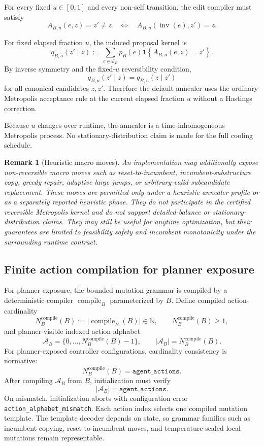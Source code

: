 \documentclass[11pt]{article}
\newtheorem{remark}{Remark}
\begin{document}
For every fixed $u\in[0,1]$ and every non-self transition, the edit compiler
must satisfy
\[
A_{B,u}(e,z)=z'\ne z
\quad\Longleftrightarrow\quad
A_{B,u}(\operatorname{inv}(e),z')=z.
\]

For fixed elapsed fraction $u$, the induced proposal kernel is
\[
q_{B,u}(z'\mid z)
:=
\sum_{e\in\mathcal{E}_B}
p_B(e)\mathbf{1}\!\left\{A_{B,u}(e,z)=z'\right\}.
\]
By inverse symmetry and the fixed-$u$ reversibility condition,
\[
q_{B,u}(z'\mid z)=q_{B,u}(z\mid z')
\]
for all canonical candidates $z,z'$. Therefore the default annealer uses the
ordinary Metropolis acceptance rule at the current elapsed fraction $u$
without a Hastings correction.

Because $u$ changes over runtime, the annealer is a time-inhomogeneous
Metropolis process. No stationary-distribution claim is made for the full
cooling schedule.

\begin{remark}[Heuristic macro moves]
An implementation may additionally expose non-reversible macro moves such as
reset-to-incumbent, incumbent-substructure copy, greedy repair, adaptive large
jumps, or arbitrary-valid-subcandidate replacement. These moves are permitted
only under a heuristic annealer profile or as a separately reported heuristic
phase. They do not participate in the certified reversible Metropolis kernel
and do not support detailed-balance or stationary-distribution claims. They
may still be useful for anytime optimization, but their guarantees are limited
to feasibility safety and incumbent monotonicity under the surrounding runtime
contract.
\end{remark}

\subsection{Finite action compilation for planner exposure}\label{sec:action-compile}

For planner exposure, the bounded mutation grammar is compiled by a
deterministic compiler $\operatorname{compile}_B$ parameterized by $B$.
Define compiled action-cardinality
\[
N_B^{\mathrm{compile}}(B):=\big|\operatorname{compile}_B(B)\big|\in\mathbb{N},
\qquad
N_B^{\mathrm{compile}}(B)\ge 1,
\]
and planner-visible indexed action alphabet
\[
\mathcal{A}_B=\{0,\dots,N_B^{\mathrm{compile}}(B)-1\},
\qquad
|\mathcal{A}_B|=N_B^{\mathrm{compile}}(B).
\]
For planner-exposed controller configurations, cardinality consistency is
normative:
\[
N_B^{\mathrm{compile}}(B)=\texttt{agent\_actions}.
\]
After compiling $\mathcal{A}_B$ from $B$, initialization must verify
\[
|\mathcal{A}_B|=\texttt{agent\_actions}.
\]
On mismatch, initialization aborts with configuration error
\texttt{action\_alphabet\_mismatch}.
Each action index selects one compiled mutation template. The template decoder
depends on state, so grammar families such as incumbent copying,
reset-to-incumbent moves, and temperature-scaled local mutations remain
representable.
\end{document}
